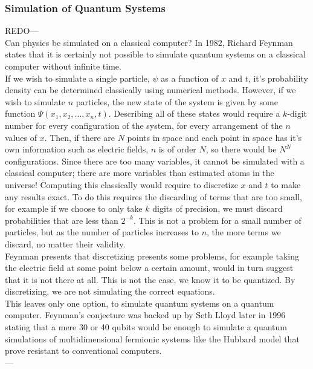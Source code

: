 \documentclass[reqno]{amsart}
\numberwithin{equation}{section}
\numberwithin{figure}{section}
\begin{document}
\subsubsection{Simulation of Quantum Systems}
\begin{justify}
REDO--- \\
Can physics be simulated on a classical computer? In 1982, Richard Feynman states that it is certainly not possible to simulate quantum systems on a classical computer without infinite time. \cite{Feynman1982} \\

If we wish to simulate a single particle, $\psi$ as a function of $x$ and $t$, it's probability density can be determined classically using numerical methods. \cite{Schroedinger1926} However, if we wish to simulate $n$ particles, the new state of the system is given by some function $\Psi(x_{1}, x_{2}, \ldots, x_{n}, t)$. Describing all of these states would require a $k$-digit number for every configuration of the system, for every arrangement of the $n$ values of $x$. Then, if there are $N$ points in space and each point in space has it's own information such as electric fields, $n$ is of order $N$, so there would be $N^N$ configurations. Since there are too many variables, it cannot be simulated with a classical computer; there are more variables than estimated atoms in the universe! Computing this classically would require to discretize $x$ and $t$ to make any results exact. To do this requires the discarding of terms that are too small, for example if we choose to only take $k$ digits of precision, we must discard probabilities that are less than $2^{-k}$. This is not a problem for a small number of particles, but as the number of particles increases to $n$, the more terms we discard, no matter their validity. \\

Feynman presents that discretizing presents some problems, for example taking the electric field at some point below a certain amount, would in turn suggest that it is not there at all. This is not the case, we know it to be quantized. By discretizing, we are not simulating the correct equations. \\

This leaves only one option, to simulate quantum systems on a quantum computer. Feynman's conjecture was backed up by Seth Lloyd later in 1996 \cite{Lloyd1996} stating that a mere 30 or 40 qubits would be enough to simulate a quantum simulations of multidimensional fermionic systems like the Hubbard model that prove resistant to conventional computers. \\
---
\end{justify}
\end{document}

